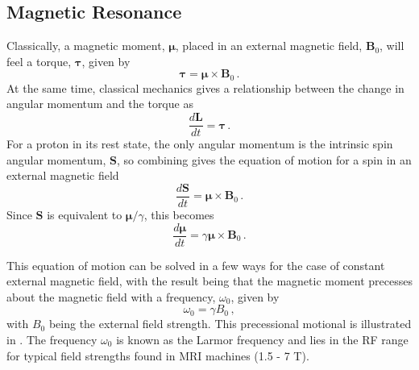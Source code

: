 \subsection{Magnetic Resonance}
\label{sec:bg_resonance}
Classically, a magnetic moment, $\boldsymbol{\mu}$, placed in an external magnetic field, $\mathbf{B}_0$, will feel a torque, $\boldsymbol{\tau}$, given by \cite{Haacke1999} 
\begin{equation}
\label{eq:torque}
\boldsymbol{\tau} = \boldsymbol{\mu} \times \mathbf{B}_0 \,.
\end{equation}
At the same time, classical mechanics gives a relationship between the change in angular momentum and the torque as \cite{Haacke1999} 
\begin{equation}
\label{eq:dLdt}
\frac{d\mathbf{L}}{dt} = \boldsymbol{\tau}\,. 
\end{equation}
For a proton in its rest state, the only angular momentum is the intrinsic spin angular momentum, $\mathbf{S}$, so combining  gives the equation of motion for a spin in an external magnetic field
\begin{equation}
\frac{d\mathbf{S}}{dt} = \boldsymbol{\mu} \times \mathbf{B}_0 \,.
\end{equation}
Since $\mathbf{S}$ is equivalent to $\boldsymbol{\mu}/\gamma$, this becomes
\begin{equation}
\frac{d\boldsymbol{\mu}}{dt} = \gamma\boldsymbol{\mu} \times \mathbf{B}_0\,.
\label{eq:dmudt}
\end{equation}

This equation of motion can be solved in a few ways for the case of constant external magnetic field, with the result being that the magnetic moment precesses about the magnetic field with a frequency, $\omega_0$, given by\cite{Levitt2008}
\begin{equation}
\label{eq:LarmorFreq}
\omega_0 = \gamma B_0\,,
\end{equation}
with $B_0$ being the external field strength. 
This precessional motional is illustrated in .
The frequency $\omega_0$ is known as the Larmor frequency and lies in the \ac{RF} range for typical field strengths found in MRI machines (1.5 - 7 T).

